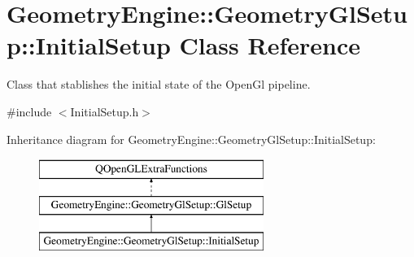 \hypertarget{class_geometry_engine_1_1_geometry_gl_setup_1_1_initial_setup}{}\section{Geometry\+Engine\+::Geometry\+Gl\+Setup\+::Initial\+Setup Class Reference}
\label{class_geometry_engine_1_1_geometry_gl_setup_1_1_initial_setup}


Class that stablishes the initial state of the Open\+Gl pipeline.  




{\ttfamily \#include $<$Initial\+Setup.\+h$>$}

Inheritance diagram for Geometry\+Engine\+::Geometry\+Gl\+Setup\+::Initial\+Setup\+:\begin{figure}[H]
\begin{center}
\leavevmode
\includegraphics[height=3.000000cm]{class_geometry_engine_1_1_geometry_gl_setup_1_1_initial_setup}
\end{center}
\end{figure}

